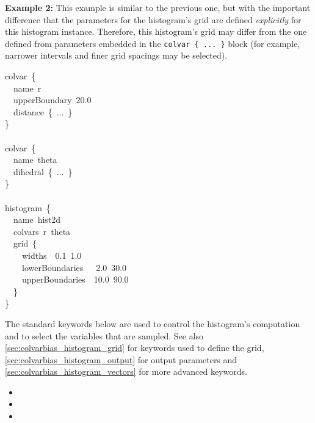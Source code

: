 \noindent\textbf{Example 2:} This example is similar to the previous one, but with the important difference that the parameters for the histogram's grid are defined \emph{explicitly} for this histogram instance.  Therefore, this histogram's grid may differ from the one defined from parameters embedded in the \texttt{colvar~\{~...~\}} block (for example, narrower intervals and finer grid spacings may be selected).
\begin{cvexampleinput}
\-colvar~\{\\
\-\-~~name~r\\
\-\-~~upperBoundary~20.0\\
\-\-~~distance~\{~...~\}\\
\-\}\\
\\
\-colvar~\{\\
\-\-~~name~theta\\
\-\-~~dihedral~\{~...~\}\\
\-\}\\
\\
\-histogram~\{\\
\-\-~~name~hist2d\\
\-\-~~colvars~r~theta\\
\-\-~~grid~\{\\
\-\-~~~~widths~~0.1~1.0\\
\-\-~~~~lowerBoundaries~~~2.0~30.0\\
\-\-~~~~upperBoundaries~~10.0~90.0\\
\-\-~~\}\\
\-\}\\
\end{cvexampleinput}


The standard keywords below are used to control the histogram's computation and to select the variables that are sampled.  See also \ref{sec:colvarbias_histogram_grid} for keywords used to define the grid, \ref{sec:colvarbias_histogram_output} for output parameters and \ref{sec:colvarbias_histogram_vectors} for more advanced keywords.

\begin{itemize}

\item {}
\item {}
\item {}

\end{itemize}


